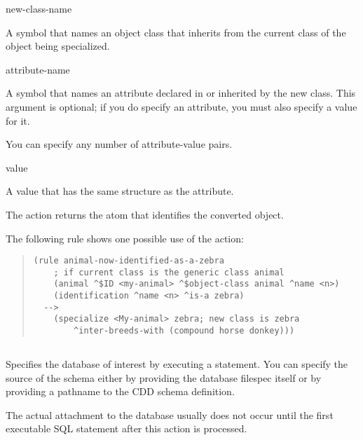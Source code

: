 {{\begin{arguments}
\item[new-class-name]

  A symbol that names an object class that inherits from the current
  class of the object being specialized.

\item[attribute-name]

  A symbol that names an attribute declared in or inherited by the new
  class. This argument is optional; if you do specify an attribute,
  you must also specify a value for it.

  You can specify any number of attribute-value pairs.

\item[value]

  A value that has the same structure as the attribute.
\end{arguments}

\ReturnValue

The  action returns the  atom that
identifies the converted object.

\Example

The following rule shows one possible use of the 
action:

\begin{quote}
\begin{verbatim}
(rule animal-now-identified-as-a-zebra
    ; if current class is the generic class animal
    (animal ^$ID <my-animal> ^$object-class animal ^name <n>)
    (identification ^name <n> ^is-a zebra)
  -->
    (specialize <My-animal> zebra; new class is zebra
        ^inter-breeds-with (compound horse donkey)))
\end{verbatim}
\end{quote}

\subsection{}

Specifies the database of interest by executing a 
statement. You can specify the source of the schema either by
providing the database filespec itself or by providing a pathname to
the CDD schema definition.

\begin{note}
  The actual attachment to the database usually does not occur until
  the first executable SQL statement after this action is processed.
\end{note}

}}
